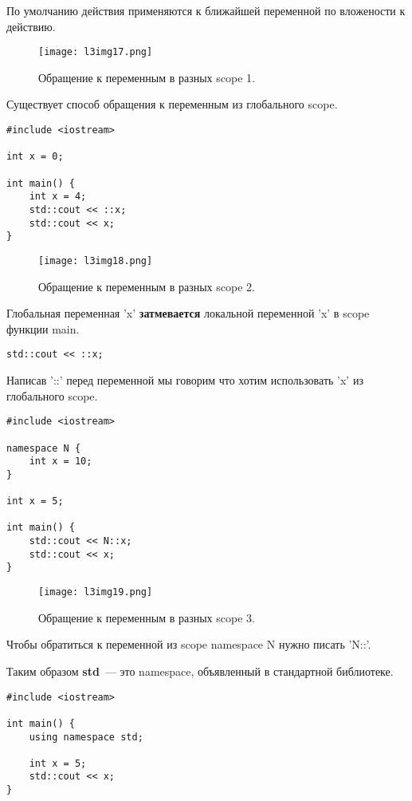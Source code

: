 По умолчанию действия применяются к ближайшей переменной по вложености к действию.

\begin{figure}[h]
    \centering
    \texttt{[image: l3img17.png]}
    \caption{Обращение к переменным в разных scope 1.}
    \label{l3img17}
\end{figure}

Существует способ обращения к переменным из глобального scope.

\begin{verbatim}
#include <iostream>

int x = 0;

int main() {
    int x = 4;
    std::cout << ::x;
    std::cout << x;
}
\end{verbatim}

\begin{figure}[h]
    \centering
    \texttt{[image: l3img18.png]}
    \caption{Обращение к переменным в разных scope 2.}
    \label{l3img18}
\end{figure}

Глобальная переменная 'x' \textbf{затмевается} локальной переменной 'x' в scope функции main.

\begin{verbatim}
std::cout << ::x;
\end{verbatim}

Написав '::' перед переменной мы говорим что хотим использовать 'x' из глобального scope.


\begin{verbatim}
#include <iostream>

namespace N {
    int x = 10;
}

int x = 5;

int main() {
    std::cout << N::x;
    std::cout << x;
}
\end{verbatim}

\begin{figure}[h]
    \centering
    \texttt{[image: l3img19.png]}
    \caption{Обращение к переменным в разных scope 3.}
    \label{l3img19}
\end{figure}

Чтобы обратиться к переменной из scope namespace N нужно писать 'N::'.

Таким образом \textbf{std}~--- это namespace, объявленный в стандартной библиотеке.

\begin{verbatim}
#include <iostream>

int main() {
    using namespace std;

    int x = 5;
    std::cout << x;
}
\end{verbatim}

